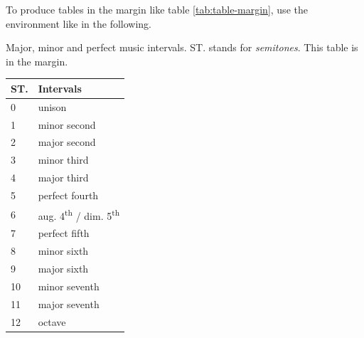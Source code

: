 To produce tables in the margin like table \ref{tab:table-margin}, use the  environment like in the following.

\begin{margintable}[0pt]\small
    \caption{Major, minor and perfect music intervals. ST. stands for \textit{semitones}. This table is in the margin. \label{tab:table-margin}}
    \begin{tabular}{ll}
        \toprule
        \textbf{ST.} & \textbf{Intervals}                                      \\
        \midrule
        0            & unison                                                  \\
        1            & minor second                                            \\
        2            & major second                                            \\
        3            & minor third                                             \\
        4            & major third                                             \\
        5            & perfect fourth                                          \\
        6            & aug. 4\textsuperscript{th} / dim. 5\textsuperscript{th} \\
        7            & perfect fifth                                           \\
        8            & minor sixth                                             \\
        9            & major sixth                                             \\
        10           & minor seventh                                           \\
        11           & major seventh                                           \\
        12           & octave                                                  \\
        \bottomrule
    \end{tabular}
\end{margintable}

